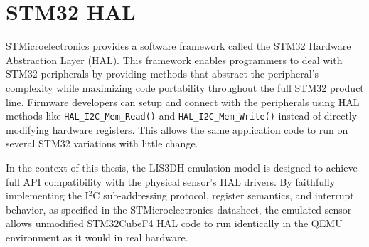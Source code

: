 \section{STM32 HAL}
\label{chap:analysis_firmware}

STMicroelectronics provides a software framework called the STM32 Hardware Abstraction Layer (HAL)\cite{stmicroelectronics_stm32f4_hal}. This framework enables programmers to deal with STM32 peripherals by providing methods that abstract the peripheral's complexity while maximizing code portability throughout the full STM32 product line. Firmware developers can setup and connect with the peripherals using HAL methods like \texttt{HAL\_I2C\_Mem\_Read()} and \texttt{HAL\_I2C\_Mem\_Write()} instead of directly modifying hardware registers. This allows the same application code to run on several STM32 variations with little change.

In the context of this thesis, the LIS3DH emulation model is designed to achieve full API compatibility with the physical sensor's HAL drivers. By faithfully implementing the I$^2$C sub-addressing protocol, register semantics, and interrupt behavior, as specified in the STMicroelectronics datasheet, the emulated sensor allows unmodified STM32CubeF4 HAL code to run identically in the QEMU environment as it would in real hardware.